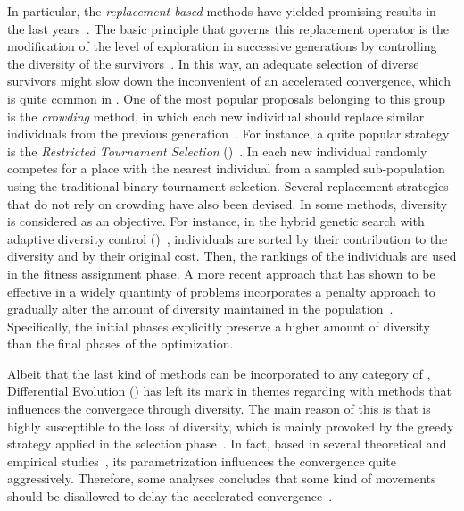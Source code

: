 %
In particular, the \textit{replacement-based} methods have yielded promising results in the last years~\cite{segura2016improving}.
%
The basic principle that governs this replacement operator is the modification of the level of exploration in successive generations by controlling the diversity of the survivors~\cite{segura2015novel}.
%
In this way, an adequate selection of diverse survivors might slow down the inconvenient of an accelerated convergence, which is quite common in \EAS{}.
%
One of the most popular proposals belonging to this group is the \textit{crowding} method, in which each new individual should replace similar individuals from the previous generation~\cite{mengshoel2014adaptive}.
%
For instance, a quite popular strategy is the \textit{Restricted Tournament Selection} (\RTS{})~\cite{harik1995finding}.
%
In \RTS{} each new individual randomly competes for a place with the nearest individual from a sampled sub-population using the traditional binary tournament selection.
%
Several replacement strategies that do not rely on crowding have also been devised.
%
In some methods, diversity is considered as an objective.
%
For instance, in the hybrid genetic search with adaptive diversity control (\HGSADC{})~\cite{vidal2013hybrid}, individuals are sorted by their contribution to the diversity and by their original cost.
%
Then, the rankings of the individuals are used in the fitness assignment phase.
%
A more recent approach that has shown to be effective in a widely quantinty of problems incorporates a penalty approach to gradually alter the amount of diversity maintained in the population~\cite{segura2015novel, segura2016improving, castillo2019differential, angel2018explicit,romero2018memetic}.
%
Specifically, the initial phases explicitly preserve a higher amount of diversity than the final phases of the optimization.
%

Albeit that the last kind of methods can be incorporated to any category of \EA{}, Differential Evolution (\DE{}) has left its mark in themes regarding with methods that influences the convergece through diversity.
%
The main reason of this is that \DE{} is highly susceptible to the loss of diversity, which is mainly provoked by the greedy strategy applied in the selection phase~\cite{castillo2017multi}.
%
In fact, based in several theoretical and empirical studies~\cite{zaharie2003control, montgomery2009differential}, its parametrization influences the convergence quite aggressively.
%
Therefore, some analyses concludes that some kind of movements should be disallowed to delay the accelerated convergence~\cite{montgomery2009differential}.
%

